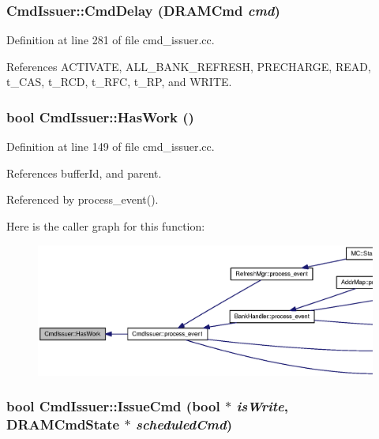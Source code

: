 \subsubsection[{CmdDelay}]{ CmdIssuer::CmdDelay ({\bf DRAMCmd} {\em cmd})}\label{classCmdIssuer_a24df46861dc460b678957f7bef64631}




Definition at line 281 of file cmd\_\-issuer.cc.

References ACTIVATE, ALL\_\-BANK\_\-REFRESH, PRECHARGE, READ, t\_\-CAS, t\_\-RCD, t\_\-RFC, t\_\-RP, and WRITE.
\subsubsection[{HasWork}]{\setlength{\rightskip}{0pt plus 5cm}bool CmdIssuer::HasWork ()}\label{classCmdIssuer_feb7f8dea256a6352ec8cf65ec0dd484}




Definition at line 149 of file cmd\_\-issuer.cc.

References bufferId, and parent.

Referenced by process\_\-event().

Here is the caller graph for this function:\nopagebreak
\begin{figure}[H]
\begin{center}
\leavevmode
\includegraphics[width=420pt]{classCmdIssuer_feb7f8dea256a6352ec8cf65ec0dd484_icgraph}
\end{center}
\end{figure}
\subsubsection[{IssueCmd}]{\setlength{\rightskip}{0pt plus 5cm}bool CmdIssuer::IssueCmd (bool $\ast$ {\em isWrite}, \/  {\bf DRAMCmdState} $\ast$ {\em scheduledCmd})}\label{classCmdIssuer_7bff6a1ba1f511a08925d9bd55a47cab}




